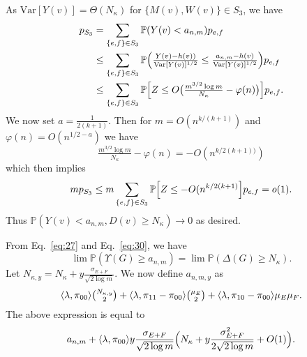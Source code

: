 \documentclass[10pt,journal,compsoc]{IEEEtran}
\theoremstyle{definition}
\begin{document}
\begin{IEEEproof}[Lemma~8]
\begin{IEEEproof}[Eq.~\eqref{eq:30}]
\begin{equation}
  \end{equation}
  As $\mathrm{Var}[Y(v)] = \Theta(N_\kappa)$ for $\{M(v), W(v)\} \in
  S_3$, we have
  \begin{equation}
    \label{eq:39}
    \begin{split}
      p_{S_3} &= \sum_{\{e,f\} \in S_3} \mathbb{P}( Y(v) < a_{n,m}) p_{e,f} 
      \\ &\leq \sum_{\{e,f\} \in S_3} \mathbb{P}\Bigl(\tfrac{Y(v) - h(v))}{\mathrm{Var}[Y(v)]^{1/2}} \leq \tfrac{a_{n,m} -
      h(v)}{\mathrm{Var}[Y(v)]^{1/2}}\Bigr)p_{e,f} \\
    &\leq \sum_{\{e,f\} \in S_3} \mathbb{P}\Bigl[Z \leq
    O\bigl(\tfrac{m^{3/2} \log m}{N_{\kappa}} - \varphi(n)\bigr)\Bigr]
    p_{e,f}.
    \end{split}
  \end{equation}
  We now set $a = \tfrac{1}{2(k+1)}$. Then for $m =
  O(n^{k/(k+1)})$ and $\varphi(n) = O(n^{1/2 - a})$ we have
  \begin{equation}
    \label{eq:41}
    \tfrac{m^{3/2} \log m}{N_\kappa} - \varphi(n) =
    -O(n^{k/2(k+1))})
  \end{equation}
  which then implies
  \begin{equation}
    \label{eq:44}
    m p_{S_3} \leq m \sum_{\{e,f\} \in S_3} \mathbb{P} \Bigl[Z \leq
    - O(n^{k/2(k+1)}\Bigr] p_{e,f} = o(1).
  \end{equation}
  Thus $\mathbb{P}(Y(v) < a_{n,m}, D(v) \geq
      N_{\kappa}) \rightarrow 0$ as desired.
\end{IEEEproof}
From Eq.~\eqref{eq:27} and Eq.~\eqref{eq:30}, we have
\begin{equation}
  \label{eq:40}
 \lim
\mathbb{P}(\Upsilon(G) \geq a_{n,m}) = \lim \mathbb{P}(\Delta(G) \geq
N_{\kappa}).
 \end{equation}
Let $N_{\kappa,y} = N_\kappa + y \tfrac{\sigma_{E+F}}{\sqrt{2
    \log{m}}}$. We now define $a_{n,m,y}$ as 
\begin{equation*}
  \langle \lambda, \pi_{00} \rangle
    \tbinom{N_{\kappa,y}}{2} +
  \langle \lambda, \pi_{11} - \pi_{00} \rangle \tbinom{\mu_E}{2}  +
  \langle \lambda, \pi_{10} - \pi_{00} \rangle \mu_E \mu_F.
\end{equation*}
The above expression is equal to 
\begin{equation}
  \label{eq:57}
 a_{n,m} + \langle \lambda, \pi_{00} \rangle y
  \frac{\sigma_{E+F}}{\sqrt{2 \log m}} \Bigl(N_{\kappa} + y
  \frac{\sigma_{E+F}^{2}}{2 \sqrt{2 \log{m}}} + O(1) \Bigr).
\end{equation}

\end{IEEEproof}
\end{document}
